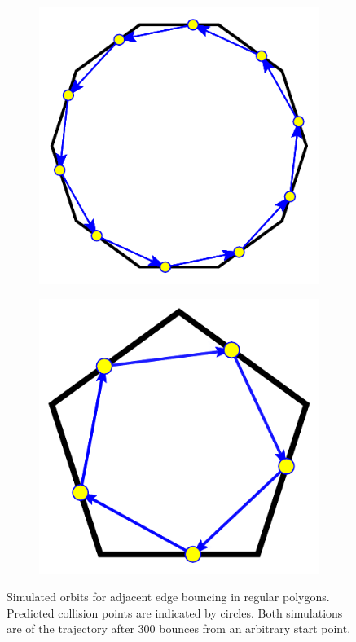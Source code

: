 \documentclass[letterpaper, 10 pt, conference]{ieeeconf}  %
\begin{document}
\begin{figure}[th]
\begin{subfigure}{.25\textwidth}
\centering

\includegraphics[width=0.7\linewidth]{../figs/dec_limit_0pt2.pdf}

\end{subfigure}%
\begin{subfigure}{0.25\textwidth}

\includegraphics[width=0.7\linewidth]{../figs/pent_limit_0pt5.pdf}

\end{subfigure}

\caption{Simulated orbits for adjacent edge bouncing in
regular polygons. Predicted collision points are indicated by circles. Both simulations are of the trajectory after 300 bounces
from an arbitrary start point. \label{prediction}}
\end{figure}
\end{document}
